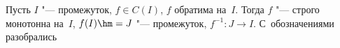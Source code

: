 
Пусть $I$ "--- промежуток, $f\in C(I)$, $f$ обратима на~$I$. Тогда $f$ "--- строго монотонна на~$I$, $f(I)\hm=J$ "--- промежуток, $f^{-1}\colon J\to I$. С~обозначениями разобрались

